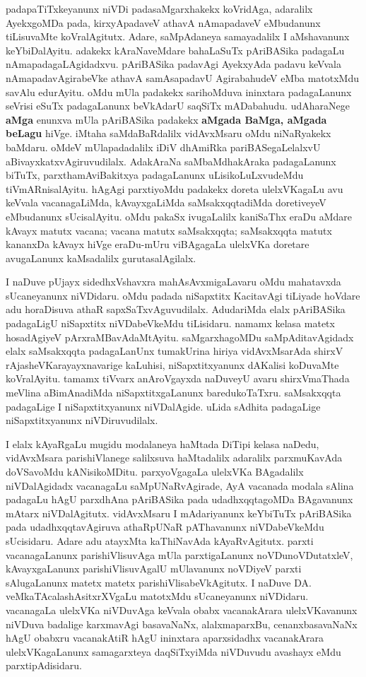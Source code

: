 padapaTiTxkeyanunx niVDi padasaMgarxhakekx koVridAga, adaralilx AyekxgoMDa pada, kirxyApadaveV athavA nAmapadaveV eMbudanunx tiLisuvaMte koVralAgitutx. Adare, saMpAdaneya samayadalilx I aMshavanunx keYbiDalAyitu. adakekx kAraNaveMdare bahaLaSuTx pAriBASika padagaLu nAmapadagaLAgidadxvu. pAriBASika padavAgi AyekxyAda padavu keVvala nAmapadavAgirabeVke athavA samAsa\-padavU AgirabahudeV eMba matotxMdu savAlu edurAyitu. oMdu mUla padakekx sarihoMduva ininxtara padagaLanunx seVrisi eSuTx padagaLanunx beVkAdarU saqSiTx mADabahudu. udAharaNege \textbf{aMga} enunxva mUla pAriBASika padakekx \textbf{aMgada BaMga, aMgada beLagu} hiVge. iMtaha saMdaBaRdalilx vidAvxMsaru oMdu niNaRyakekx baMdaru. oMdeV mUlapadadalilx iDiV dhAmiRka pariBASegaLelalxvU aBivayxkatxvAgiruvudilalx. AdakAraNa saMbaMdhakAraka padagaLanunx biTuTx, parxthamAviBakitxya padagaLanunx uLisikoLuLxvudeMdu  tiVmARnisalAyitu. hAgAgi parxtiyoMdu padakekx doreta ulelxVKagaLu avu keVvala vacanagaLiMda, kAvayxgaLiMda saMsakxqqtadiMda doretiveyeV eMbudanunx sUcisalAyitu. oMdu pakaSx ivugaLalilx  kaniSaThx eraDu aMdare kAvayx matutx vacana; vacana matutx saMsakxqqta; saMsakxqqta matutx kananxDa kAvayx hiVge eraDu-mUru viBAgagaLa ulelxVKa doretare avugaLanunx kaMsadalilx gurutasalAgilalx.

I naDuve pUjayx sidedhxVshavxra mahAsAvxmigaLavaru oMdu mahatavxda sUcaneyanunx niVDidaru. oMdu padada niSapxtitx KacitavAgi tiLiyade hoVdare adu horaDisuva athaR sapxSaTxvAguvudilalx. AdudariMda elalx pAriBASika padagaLigU niSapxtitx niVDabeVkeMdu tiLisidaru. namamx kelasa matetx hosadAgiyeV pArxraMBavAdaMtAyitu. saMgarxhagoMDu saMpAditavAgidadx elalx saMsakxqqta padagaLanUnx tumakUrina hiriya vidAvxMsarAda shirxV rAjasheVKarayayxnavarige kaLuhisi, niSapxtitxyanunx dAKalisi koDuvaMte koVralAyitu. tamamx tiVvarx anAroVgayxda naDuveyU avaru shirxVmaThada meVlina aBimAnadiMda niSapxtitxgaLanunx baredukoTaTxru. saMsakxqqta padagaLige I niSapxtitxyanunx niVDalAgide. uLida sAdhita padagaLige niSapxtitxyanunx niVDiruvudilalx.

I elalx kAyaRgaLu mugidu modalaneya haMtada DiTipi kelasa naDedu, vidAvxMsara parishiVlanege salilxsuva haMtadalilx adaralilx parxmuKavAda doVSavoMdu kANisikoMDitu. parxyoVgagaLa ulelxVKa BAgadalilx niVDalAgidadx vacanagaLu saMpUNaRvAgirade, AyA vacanada modala sAlina padagaLu hAgU parxdhAna pAriBASika pada udadhxqqtagoMDa BAgavanunx mAtarx niVDalAgitutx. vidAvxMsaru I mAdariyanunx keYbiTuTx pAriBASika pada udadhxqqtavAgiruva athaRpUNaR pAThavanunx niVDabeVkeMdu sUcisidaru. Adare adu atayxMta kaThiNavAda kAyaRvAgitutx. parxti vacanagaLanunx parishiVlisuvAga mUla parxtigaLanunx noVDunoVDutatxleV, kAvayxgaLanunx parishiVlisuvAgalU mUlavanunx noVDiyeV parxti sAlugaLanunx matetx matetx parishiVlisabeVkAgitutx. I naDuve DA. veMkaTAcalashAsitxrXVgaLu matotxMdu sUcaneyanunx niVDidaru. vacanagaLa ulelxVKa niVDuvAga keVvala obabx vacanakArara ulelxVKavanunx niVDuva badalige karxmavAgi basavaNaNx, alalxmaparxBu, cenanxbasavaNaNx hAgU obabxru vacanakAtiR hAgU ininxtara aparxsidadhx vacanakArara ulelxVKagaLanunx samagarxteya daqSiTxyiMda niVDuvudu avashayx eMdu parxtipAdisidaru.

